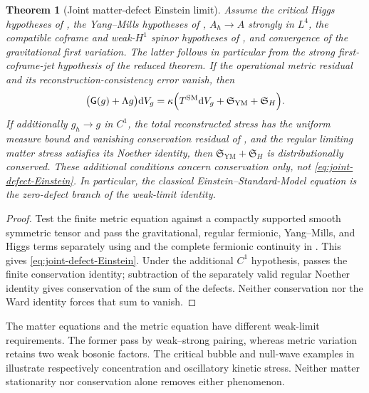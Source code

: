 \documentclass[11pt]{article}
\numberwithin{equation}{section}
\newtheorem{theorem}{Theorem}[section]
\theoremstyle{definition}
\theoremstyle{remark}
\newcommand{\dd}{\mathrm d}
\newcommand{\Eins}{\mathsf G}
\newcommand{\dV}{\dd V}
\begin{document}
\begin{theorem}[Joint matter-defect Einstein limit]
\label{thm:joint-defect}
Assume the critical Higgs hypotheses of , the
Yang--Mills hypotheses of , $A_h\to A$ strongly in $L^4$,
the compatible coframe and weak-$H^1$ spinor hypotheses of
, and convergence of the gravitational first
variation.  The latter follows in particular from the strong first-coframe-jet hypothesis of the reduced theorem.  If the operational metric residual and its reconstruction-consistency error vanish, then
\begin{equation}
 \bigl(\Eins(g)+\Lambda g\bigr)\dV_g
 =\kappa\Bigl(T^{\mathrm{SM}}\dV_g
       +\mathfrak S_{\mathrm{YM}}+\mathfrak S_H\Bigr).
 \label{eq:joint-defect-Einstein}
\end{equation}
If additionally $g_h\to g$ in $C^1$, the total reconstructed stress
has the uniform measure bound and vanishing conservation residual of
, and the regular limiting matter
stress satisfies its Noether identity, then
$\mathfrak S_{\mathrm{YM}}+\mathfrak S_H$ is distributionally conserved.
These additional conditions concern conservation only, not
\eqref{eq:joint-defect-Einstein}. In particular, the classical
Einstein--Standard-Model equation is the zero-defect branch of the weak-limit
identity.
\end{theorem}
\begin{proof}
Test the finite metric equation against a compactly supported smooth symmetric tensor and pass the gravitational, regular fermionic, Yang--Mills, and Higgs terms separately using  and the complete fermionic continuity in .  This gives \eqref{eq:joint-defect-Einstein}.  Under the additional $C^1$ hypothesis,
 passes the finite conservation
identity; subtraction of the separately valid regular Noether identity gives
conservation of the sum of the defects. Neither conservation nor the Ward
identity forces that sum to vanish.
\end{proof}

The matter equations and the metric equation have different weak-limit
requirements. The former pass by weak--strong pairing, whereas metric
variation retains two weak bosonic factors. The critical bubble and null-wave
examples in  illustrate respectively
concentration and oscillatory kinetic stress. Neither matter stationarity
nor conservation alone removes either phenomenon.
\end{document}
